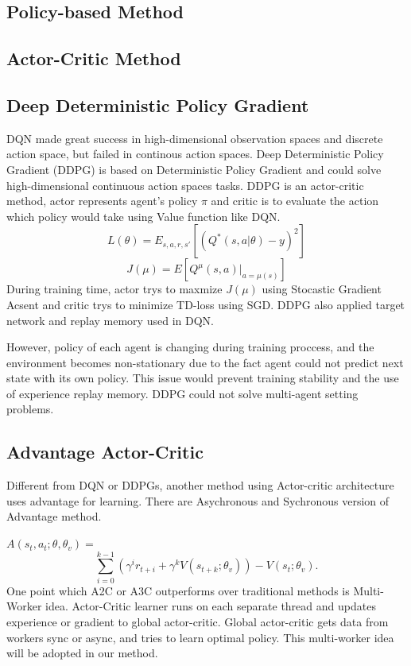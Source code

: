 \documentclass[11pt,twocolumn]{jarticle} %
\begin{document}
\subsection{Policy-based Method}

\subsection{Actor-Critic Method}

\subsection*{Deep Deterministic Policy Gradient}
DQN made great success in high-dimensional observation spaces and discrete action space, but failed in continous action spaces. Deep Deterministic Policy Gradient (DDPG) \cite{6} is based on Deterministic Policy Gradient \cite{11} and could solve high-dimensional continuous action spaces tasks. DDPG is an actor-critic method, actor represents agent's policy $\pi$ and critic is to evaluate the action which policy would take using Value function like DQN. 
\begin{equation}
L(\theta) = E_{s,a,r,s'}[(Q^*(s, a|\theta) - y)^2] 
\end{equation}
\begin{equation}
J(\mu) = E[Q^\mu(s, a) | _{a=\mu(s)}]
\end{equation}
During training time, actor trys to maxmize $J(\mu)$ using Stocastic Gradient Acsent and critic trys to minimize TD-loss using SGD. DDPG also applied target network and replay memory used in DQN. \par
However, policy of each agent is changing during training proccess, and the environment becomes non-stationary due to the fact agent could not predict next state with its own policy. This issue would prevent training stability and the use of experience replay memory. DDPG could not solve multi-agent setting problems.

\subsection*{Advantage Actor-Critic}
Different from DQN or DDPGs, another method using Actor-critic architecture uses advantage for learning. 
There are Asychronous \cite{12} and Sychronous \cite{13} version of Advantage method.\par
$A(s_t, a_t; \theta, \theta_v) = $ 
\begin{equation}
\sum_{i=0}^{k-1}(\gamma^i r_{t+i} + \gamma^k V(s_{t+k};\theta_v)) - V(s_t; \theta_v).
\end{equation}
One point which A2C or A3C outperforms over traditional methods is Multi-Worker idea. Actor-Critic learner runs on each separate thread and updates experience or gradient to global actor-critic. Global actor-critic gets data from workers sync or async, and tries to learn optimal policy. This multi-worker idea will be adopted in our method.
\end{document}
